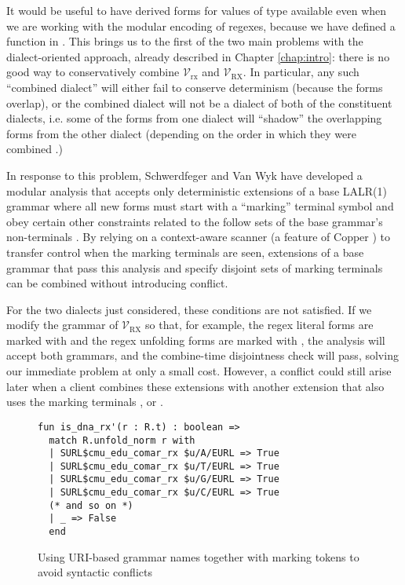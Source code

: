 {It would be useful to have derived forms for values of type  available even when we are working with the modular encoding of regexes, because we have defined a function  in . This brings us to the first of the two main problems with the dialect-oriented approach, already described in Chapter \ref{chap:intro}: there is no good way to conservatively combine $\mathcal{V}_\text{rx}$ and $\mathcal{V}_\text{RX}$. In particular, any such ``combined dialect'' will either fail to conserve determinism (because the forms overlap), or the combined dialect will not be a dialect of both of the constituent dialects, i.e. some of the forms from one dialect will ``shadow'' the overlapping forms from the other dialect (depending on the order in which they were combined \cite{Ford04a}.) 

In response to this problem, Schwerdfeger and Van Wyk have developed a modular analysis that accepts only deterministic extensions of a base LALR(1) grammar where all new forms must start with a ``marking'' terminal symbol and obey certain other constraints related to  the follow sets of the base grammar's non-terminals \cite{conf/pldi/SchwerdfegerW09}. By relying on a context-aware scanner (a feature of Copper \cite{conf/gpce/WykS07}) to transfer control when the marking terminals are seen, extensions of a base grammar that pass this analysis and specify disjoint sets of marking terminals can be combined without introducing conflict. %

For the two dialects just considered, these conditions are not satisfied. If we modify the grammar of $\mathcal{V}_\text{RX}$ so that, for example, the regex literal forms are marked with  and the regex unfolding forms are marked with , the analysis will accept both grammars, and the combine-time disjointness check will pass, solving our immediate problem at only a small cost. However, a conflict could still  arise later when a client combines these extensions with another extension that also uses the marking terminals ,  or \li{/}. %

\begin{figure}
\begin{lstlisting}[numbers=none]
fun is_dna_rx'(r : R.t) : boolean => 
  match R.unfold_norm r with 
  | SURL$cmu_edu_comar_rx $u/A/EURL => True 
  | SURL$cmu_edu_comar_rx $u/T/EURL => True
  | SURL$cmu_edu_comar_rx $u/G/EURL => True
  | SURL$cmu_edu_comar_rx $u/C/EURL => True
  (* and so on *)
  | _ => False
  end
\end{lstlisting}
\vspace{-4px}
\caption{Using URI-based grammar names together with marking tokens to avoid syntactic conflicts}
\label{fig:vanwyk}
\vspace{-6px}
\end{figure}


}
